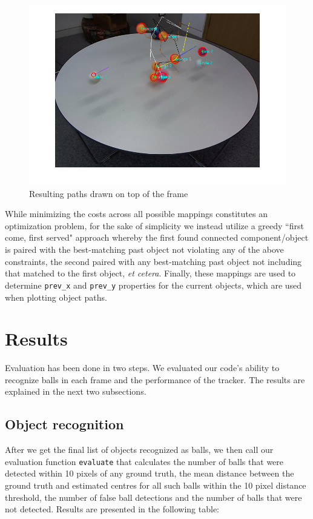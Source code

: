\documentclass[12pt,a4paper]{article}
\begin{document}
\begin{figure}
	\centering
    \includegraphics[width=140mm]{frame_35_imgs/update_ball_tracking.png}
    \caption{Resulting paths drawn on top of the frame}
	\label{my-label02}
\end{figure}

While minimizing the costs across all possible mappings constitutes an optimization problem, for the sake of simplicity we instead utilize a greedy ``first come, first served" approach whereby the first found connected component/object is paired with the best-matching past object not violating any of the above constraints, the second paired with any best-matching past object not including that matched to the first object, \textit{et cetera}. Finally, these mappings are used to determine \texttt{prev\_x} and \texttt{prev\_y} properties for the current objects, which are used when plotting object paths.

\section{Results}
Evaluation has been done in two steps. We evaluated our code's ability to recognize balls in each frame and the performance of the tracker. The results are explained in the next two subsections.

\subsection{Object recognition}
After we get the final list of objects recognized as balls, we then call our evaluation function \texttt{evaluate} that calculates the number of balls that were detected within 10 pixels of any ground truth, the mean distance between the ground truth and estimated centres for all such balls within the 10 pixel distance threshold, the number of false ball detections and the number of balls that were not detected. Results are presented in the following table:
\end{document}
